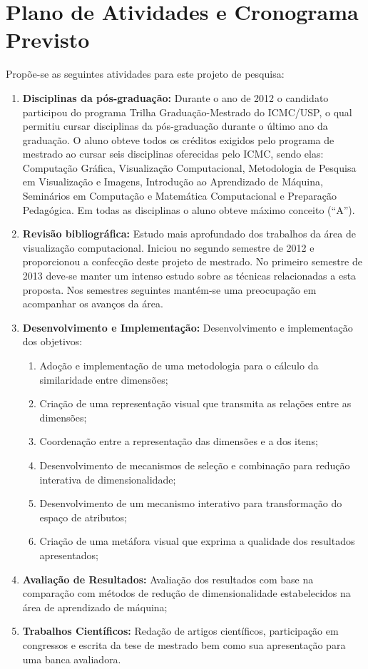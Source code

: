 \section{Plano de Atividades e Cronograma Previsto}\label{sec:cronograma}

Propõe-se as seguintes atividades para este projeto de pesquisa:

\begin{enumerate}
  \item \textbf{Disciplinas da pós-graduação:} Durante o ano de 2012 o candidato participou do programa Trilha Graduação-Mestrado do ICMC/USP, o qual permitiu cursar disciplinas da pós-graduação durante o último ano da graduação. O aluno obteve todos os créditos exigidos pelo programa de mestrado ao cursar seis disciplinas oferecidas pelo ICMC, sendo elas: Computação Gráfica, Visualização Computacional, Metodologia de Pesquisa em Visualização e Imagens, Introdução ao Aprendizado de Máquina, Seminários em Computação e Matemática Computacional e Preparação Pedagógica. Em todas as disciplinas o aluno obteve máximo conceito (``A'').
    
  \item \textbf{Revisão bibliográfica:} Estudo mais aprofundado dos trabalhos da área de visualização computacional. Iniciou no segundo semestre de 2012 e proporcionou a confecção deste projeto de mestrado. No primeiro semestre de 2013 deve-se manter um intenso estudo sobre as técnicas relacionadas a esta proposta. Nos semestres seguintes mantém-se uma preocupação em acompanhar os avanços da área.

  \item \textbf{Desenvolvimento e Implementação:} Desenvolvimento e implementação dos objetivos:
    \begin{enumerate}
      \item Adoção e implementação de uma metodologia para o cálculo da similaridade entre dimensões;
      \item Criação de uma representação visual que transmita as relações entre as dimensões;
      \item Coordenação entre a representação das dimensões e a dos itens;
      \item Desenvolvimento de mecanismos de seleção e combinação para redução interativa de dimensionalidade;
      \item Desenvolvimento de um mecanismo interativo para transformação do espaço de atributos;
      \item Criação de uma metáfora visual que exprima a qualidade dos resultados apresentados;
    \end{enumerate}

  \item \textbf{Avaliação de Resultados:} Avaliação dos resultados com base na comparação com métodos de redução de dimensionalidade estabelecidos na área de aprendizado de máquina;

  \item \textbf{Trabalhos Científicos:} Redação de artigos científicos, participação em congressos e escrita da tese de mestrado bem como sua apresentação para uma banca avaliadora.
\end{enumerate}

